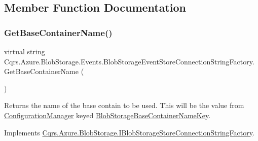 \subsection{Member Function Documentation}
\mbox{\label{classCqrs_1_1Azure_1_1BlobStorage_1_1Events_1_1BlobStorageEventStoreConnectionStringFactory_a0e6aadced9c9a583884899a4c9de2f1a_a0e6aadced9c9a583884899a4c9de2f1a}} 
\subsubsection{\texorpdfstring{Get\+Base\+Container\+Name()}{GetBaseContainerName()}}
{\footnotesize\ttfamily virtual string Cqrs.\+Azure.\+Blob\+Storage.\+Events.\+Blob\+Storage\+Event\+Store\+Connection\+String\+Factory.\+Get\+Base\+Container\+Name (\begin{DoxyParamCaption}{ }\end{DoxyParamCaption})\hspace{0.3cm}{\ttfamily [virtual]}}



Returns the name of the base contain to be used. This will be the value from \hyperlink{namespaceCqrs_1_1Azure_1_1ConfigurationManager}{Configuration\+Manager} keyed \hyperlink{classCqrs_1_1Azure_1_1BlobStorage_1_1Events_1_1BlobStorageEventStoreConnectionStringFactory_affd6198f87e483bd7a6f5930a5eaa431_affd6198f87e483bd7a6f5930a5eaa431}{Blob\+Storage\+Base\+Container\+Name\+Key}. 



Implements \hyperlink{interfaceCqrs_1_1Azure_1_1BlobStorage_1_1IBlobStorageStoreConnectionStringFactory_a57145e68e3bda84bc610fa61226a850c_a57145e68e3bda84bc610fa61226a850c}{Cqrs.\+Azure.\+Blob\+Storage.\+I\+Blob\+Storage\+Store\+Connection\+String\+Factory}.

